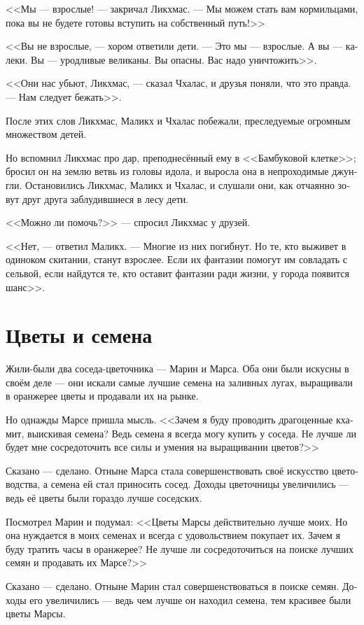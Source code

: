 \documentclass[a4paper,12pt,fleqn]{book}\usepackage{polyglossia}\setdefaultlanguage[babelshorthands=true]{russian}\setotherlanguage{english}\defaultfontfeatures{Ligatures=TeX,Mapping=tex-text}\usepackage{xcolor}\newcommand{\ml}[3]{#2}
\begin{document}
{<<Мы --- взрослые! --- закричал Ликхмас.
--- Мы можем стать вам кормильцами, пока вы не будете готовы вступить на собственный путь!>>

<<Вы не взрослые, --- хором ответили дети.
--- Это мы --- взрослые.
А вы --- калеки.
Вы --- уродливые великаны.
Вы опасны.
Вас надо уничтожить>>.

<<Они нас убьют, Ликхмас, --- сказал Чхалас, и друзья поняли, что это правда.
--- Нам следует бежать>>.

После этих слов Ликхмас, Маликх и Чхалас побежали, преследуемые огромным множеством детей.

Но вспомнил Ликхмас про дар, преподнесённый ему в <<Бамбуковой клетке>>;
бросил он на землю ветвь из головы идола, и выросла она в непроходимые джунгли.
Остановились Ликхмас, Маликх и Чхалас, и слушали они, как отчаянно зовут друг друга заблудившиеся в лесу дети.

<<Можно ли помочь?>> --- спросил Ликхмас у друзей.

<<Нет, --- ответил Маликх.
--- Многие из них погибнут.
Но те, кто выживет в одиноком скитании, станут взрослее.
Если их фантазии помогут им совладать с сельвой, если найдутся те, кто оставит фантазии ради жизни, у города появится шанс>>.

\section{Цветы и семена}

Жили-были два соседа-цветочника --- Марин и Марса.
Оба они были искусны в своём деле --- они искали самые лучшие семена на заливных лугах, выращивали в оранжерее цветы и продавали их на рынке.

Но однажды Марсе пришла мысль.
<<Зачем я буду проводить драгоценные кхамит, выискивая семена?
Ведь семена я всегда могу купить у соседа.
Не лучше ли будет мне сосредоточить все силы и умения на выращивании цветов?>>

Сказано --- сделано.
Отныне Марса стала совершенствовать своё искусство цветоводства, а семена ей стал приносить сосед.
Доходы цветочницы увеличились --- ведь её цветы были гораздо лучше соседских.

Посмотрел Марин и подумал: <<Цветы Марсы действительно лучше моих.
Но она нуждается в моих семенах и всегда с удовольствием покупает их.
Зачем я буду тратить часы в оранжерее?
Не лучше ли сосредоточиться на поиске лучших семян и продавать их Марсе?>>

Сказано --- сделано.
Отныне Марин стал совершенствоваться в поиске семян.
Доходы его увеличились --- ведь чем лучше он находил семена, тем красивее были цветы Марсы.

}
\end{document}
